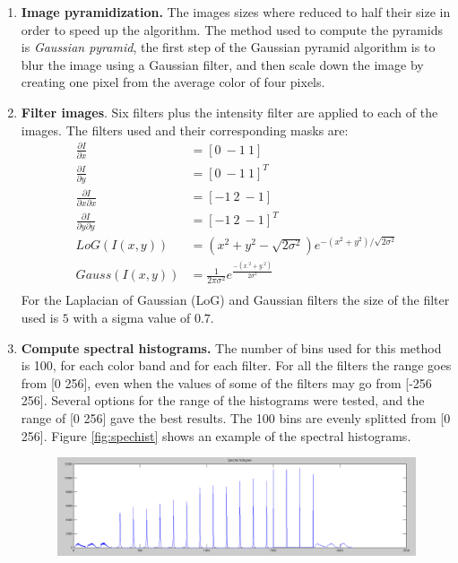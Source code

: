 \documentclass[a4paper,12pt]{article}
\begin{document}
\begin{enumerate}
    \item \textbf{Image pyramidization. } The images sizes where reduced
        to half their size in order to speed up the algorithm. The method used
        to compute the pyramids is \emph{Gaussian pyramid}, the first
        step of the Gaussian pyramid algorithm is to blur the image 
        using a Gaussian filter, and then scale down the image by 
        creating one pixel from the average color of four pixels.
    \item \textbf{Filter images}. Six filters plus the intensity
        filter are applied to each of the images. The filters 
        used and their corresponding masks are:
        \begin{equation}
            \begin{split}
                \frac{\partial I}{\partial x} & =  [0~-1~1] \\
                \frac{\partial I}{\partial y} & =  [0~-1~1]^T \\
                \frac{\partial I}{\partial x \partial x} & = [-1~2~-1] \\
                \frac{\partial I}{\partial y \partial y} & = [-1~2~-1]^T \\
                LoG(I(x,y))  & = ( x^2 + y^2 - \sqrt{2\sigma^2} ) e^{ -(x^2+y^2)/\sqrt{2\sigma^2}}\\
                Gauss(I(x,y))  & = \frac{1}{2 \pi \sigma^2} e^{ \frac{-(x.^2+y.^2)}{2\sigma^2}}\\
            \end{split}
        \end{equation}
        For the Laplacian of Gaussian (LoG) and Gaussian filters the size of the filter
        used is $5$ with a sigma value of $0.7$.
    \item \textbf{Compute spectral histograms.} The number of bins used
        for this method is 100, for each color band and for each filter. 
        For all the filters the range goes from [0 256], even when the values of some
        of the filters may go from [-256 256]. Several options for the range of the 
        histograms were tested, and the range of [0 256] gave the best results. 
        The 100 bins are evenly splitted from [0 256].
        Figure \ref{fig:spechist} shows an example of the spectral histograms. 
        \begin{figure}[h]
            \centering
            \includegraphics[totalheight=.18\textheight]{./Images/SpectralHist.png}

\end{figure}
\end{enumerate}
\end{document}
